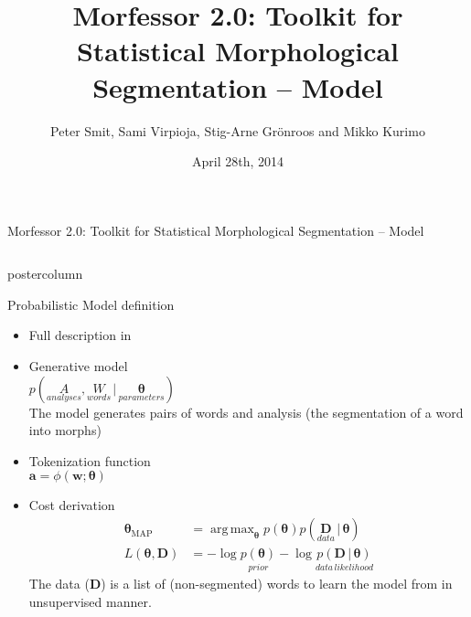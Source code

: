 \documentclass[final]{beamer} %
\title{Morfessor 2.0: Toolkit for Statistical Morphological Segmentation -- Model}
\author{Peter Smit, Sami Virpioja, Stig-Arne Gr\"onroos and Mikko Kurimo}
\institute[Aalto University]{Aalto University}
\date{April 28th, 2014}
\DeclareMathOperator*{\argmax}{arg\,max}
\newcommand{\seq}[1]{\boldsymbol{#1}}
\newcommand{\txt}[1]{\textrm{#1}}
\newcommand{\cost}{L}
\newcommand{\params}{\boldsymbol{\theta}}
\newcommand{\data}{\seq{D}}
\newcommand{\token}{\phi}
\newcommand{\vb}{\,|\,}
\begin{document}
  \begin{frame}{Morfessor 2.0: Toolkit for Statistical Morphological Segmentation -- Model} 
\begin{columns}

\begin{column}{.3\textwidth}
%            
%

      \begin{beamercolorbox}[center,wd=\textwidth]{postercolumn}
 \begin{block}{Probabilistic Model definition}
              \begin{itemize}
\item Full description in  \citep{virpioja2012thesis, virpioja2013morfessor} \\
              \item Generative model\\
$p(\underset{analyses}{A}, \underset{words}{W} \vb \underset{parameters}{\params})$\\
The model generates pairs of words and analysis (the segmentation of a word into morphs)
		\item Tokenization function\\
 $\seq{a} = \token(\seq{w}; \params)$
		\item Cost derivation\\
\begin{align*}\params_{\txt{MAP}}%
&= \argmax_{\params} p(\params) p(\underset{data}{\data} \vb \params)\\
\cost(\params, \data) &= -\log \underset{prior}{p(\params)} - \log \underset{data\,likelihood}{p(\data \vb \params)}
\end{align*}
The data ($\data$) is a list of (non-segmented) words to learn the model from in unsupervised manner.
              \end{itemize}              
            \end{block}
            

\end{beamercolorbox}
\end{column}
\end{columns}
\end{frame}
\end{document}
